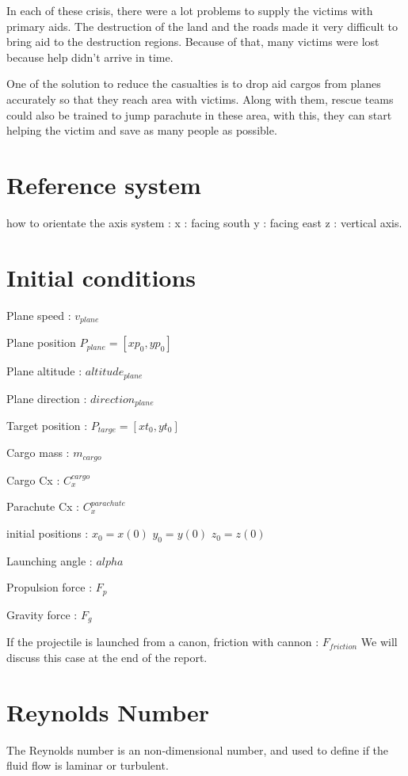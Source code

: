 \documentclass[12pt,a4paper]{article}
\begin{document}
	In each of these crisis, there were a lot problems to supply the victims with primary aids. The destruction of the land and the roads made it very difficult to bring aid to the destruction regions. Because of that, many victims were lost because help didn't arrive in time. 
	
	One of the solution to reduce the casualties is to drop aid cargos from planes accurately so that they reach area with victims. 
	Along with them, rescue teams could also be trained to jump parachute in these area, with this, they can start helping the victim and save as many people as possible. 
	
	\section{Reference system}
	how to orientate the axis system : 
	x : facing south
	y : facing east
	z : vertical axis. 
	
	\section{Initial conditions}
	
	Plane speed : $v_{plane}$
	
	Plane position $P_{plane}= [xp_0, yp_0]$
	
	Plane altitude : $altitude_{plane}$
	
	Plane direction : $direction_{plane}$
	
	Target position : $P_{targe} = [xt_0, yt_0]$ 
	
	Cargo mass : $m_{cargo}$
	
	Cargo Cx : $C_x^{cargo}$
	
	Parachute Cx : $C_x^{parachute}$
	
	initial positions : 
	$x_0 = x(0)$ 
	$y_0 = y(0)$ 
	$z_0 = z(0)$
	
	Launching angle : $alpha$
	
	Propulsion force : $F_p$
	
	Gravity force : $F_g$
	
	If the projectile is launched from a canon, 
	friction with cannon : $F_{friction}$
	We will discuss this case at the end of the report. 
	
	
	
	\section{Reynolds Number}
	The Reynolds number is an non-dimensional number, and used to define if the fluid flow is laminar or turbulent. 
	
\end{document}

